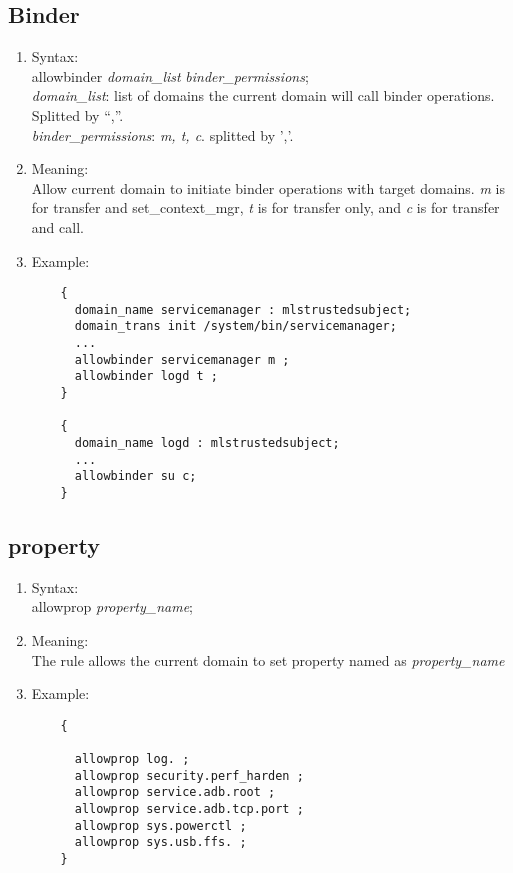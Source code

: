 \documentclass{article}
\begin{document}
\subsection{Binder}
\begin{enumerate}
	\item Syntax:\\
	allowbinder {\em domain\_list} {\em binder\_permissions};\\
	{\em domain\_list}: list of domains the current domain will call binder 
	operations. Splitted by ``,''.\\
	{\em binder\_permissions}: {\em m, t, c}. splitted by ','.
	\item Meaning:\\
	Allow current domain to initiate binder operations with target domains. 
	{\em m} is for transfer and set\_context\_mgr, {\em t} is for transfer 
	only, 
	and {\em c} is for transfer and call.
	\item Example:\\
	\begin{verbatim}
	{
	  domain_name servicemanager : mlstrustedsubject;
	  domain_trans init /system/bin/servicemanager;
	  ...
	  allowbinder servicemanager m ;
	  allowbinder logd t ;
	}
	
	{
	  domain_name logd : mlstrustedsubject;
	  ...
	  allowbinder su c;
	}
	\end{verbatim}
\end{enumerate}

\subsection{property}
\begin{enumerate}
	\item Syntax:\\
	allowprop {\em property\_name};
	\item Meaning:\\
	The rule allows the current domain to set property named as {\em 
	property\_name}
	\item Example:\\
	\begin{verbatim}
	{
	  
	  allowprop log. ;
	  allowprop security.perf_harden ;
	  allowprop service.adb.root ;
	  allowprop service.adb.tcp.port ;
	  allowprop sys.powerctl ;
	  allowprop sys.usb.ffs. ;
	}
	\end{verbatim}
\end{enumerate}
\end{document}
